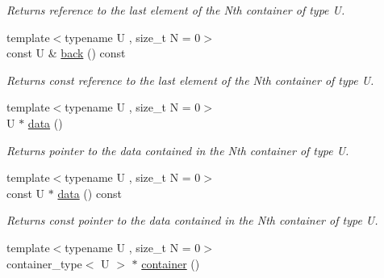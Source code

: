 \begin{DoxyCompactItemize}
\begin{DoxyCompactList}\small\item\em Returns reference to the last element of the Nth container of type U. \end{DoxyCompactList}\item 
\hypertarget{classheterogeneous_1_1heterovector_3_01_t_00_01_types_8_8_8_4_a575ac76e572a94001f06e9a77defd648}{}{\footnotesize template$<$typename U , size\+\_\+t N = 0$>$ }\\const U \& \hyperlink{classheterogeneous_1_1heterovector_3_01_t_00_01_types_8_8_8_4_a575ac76e572a94001f06e9a77defd648}{back} () const \label{classheterogeneous_1_1heterovector_3_01_t_00_01_types_8_8_8_4_a575ac76e572a94001f06e9a77defd648}

\begin{DoxyCompactList}\small\item\em Returns const reference to the last element of the Nth container of type U. \end{DoxyCompactList}\item 
\hypertarget{classheterogeneous_1_1heterovector_3_01_t_00_01_types_8_8_8_4_a7f1829bd8235eeb064f5fec463986b89}{}{\footnotesize template$<$typename U , size\+\_\+t N = 0$>$ }\\U $\ast$ \hyperlink{classheterogeneous_1_1heterovector_3_01_t_00_01_types_8_8_8_4_a7f1829bd8235eeb064f5fec463986b89}{data} ()\label{classheterogeneous_1_1heterovector_3_01_t_00_01_types_8_8_8_4_a7f1829bd8235eeb064f5fec463986b89}

\begin{DoxyCompactList}\small\item\em Returns pointer to the data contained in the Nth container of type U. \end{DoxyCompactList}\item 
\hypertarget{classheterogeneous_1_1heterovector_3_01_t_00_01_types_8_8_8_4_ac4cf19c4002a50f2122bca0ff5f0a821}{}{\footnotesize template$<$typename U , size\+\_\+t N = 0$>$ }\\const U $\ast$ \hyperlink{classheterogeneous_1_1heterovector_3_01_t_00_01_types_8_8_8_4_ac4cf19c4002a50f2122bca0ff5f0a821}{data} () const \label{classheterogeneous_1_1heterovector_3_01_t_00_01_types_8_8_8_4_ac4cf19c4002a50f2122bca0ff5f0a821}

\begin{DoxyCompactList}\small\item\em Returns const pointer to the data contained in the Nth container of type U. \end{DoxyCompactList}\item 
\hypertarget{classheterogeneous_1_1heterovector_3_01_t_00_01_types_8_8_8_4_a62bcae09d4ca0d66dc59a4e29b0e2c37}{}{\footnotesize template$<$typename U , size\+\_\+t N = 0$>$ }\\container\+\_\+type$<$ U $>$ $\ast$ \hyperlink{classheterogeneous_1_1heterovector_3_01_t_00_01_types_8_8_8_4_a62bcae09d4ca0d66dc59a4e29b0e2c37}{container} ()\label{classheterogeneous_1_1heterovector_3_01_t_00_01_types_8_8_8_4_a62bcae09d4ca0d66dc59a4e29b0e2c37}


\end{DoxyCompactItemize}
